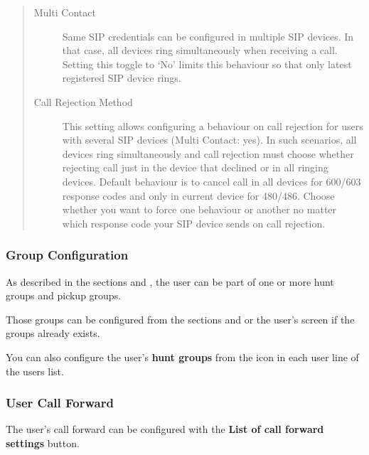 \documentclass[letterpaper,10pt,spanish]{sphinxmanual}
\begin{document}
\begin{quote}
\begin{description}
\item[{Multi Contact}] \leavevmode
Same SIP credentials can be configured in multiple SIP devices. In that case, all devices ring
simultaneously when receiving a call. Setting this toggle to `No' limits this behaviour so that
only latest registered SIP device rings.

\item[{Call Rejection Method}] \leavevmode
This setting allows configuring a behaviour on call rejection for users with several
SIP devices (Multi Contact: yes). In such scenarios, all devices ring simultaneously and call rejection must
choose whether rejecting call just in the device that declined or in all ringing devices.
Default behaviour is to cancel call in all devices for 600/603 response codes and only in
current device for 480/486. Choose whether you want to force one behaviour or another no
matter which response code your SIP device sends on call rejection.

\end{description}
\end{quote}


\subsubsection{Group Configuration}
\label{administration_portal/client/vpbx/users:group-configuration}
As described in the sections {\hyperref[administration_portal/client/vpbx/routing_endpoints/hunt_groups:huntgroups]{}} and {\hyperref[administration_portal/client/vpbx/user_configuration/pick_up_groups:capture\string-groups]{}}, the
user can be part of one or more hunt groups and pickup groups.

Those groups can be configured from the sections {\hyperref[administration_portal/client/vpbx/routing_endpoints/hunt_groups:huntgroups]{}} and
{\hyperref[administration_portal/client/vpbx/user_configuration/pick_up_groups:capture\string-groups]{}} or the user's screen if the groups already exists.

You can also configure the user's \textbf{hunt groups} from the icon in each user
line of the users list.


\subsubsection{User Call Forward}
\label{administration_portal/client/vpbx/users:user-call-forward}
The user's call forward can be configured with the \textbf{List of call forward settings}  button.
\end{document}
